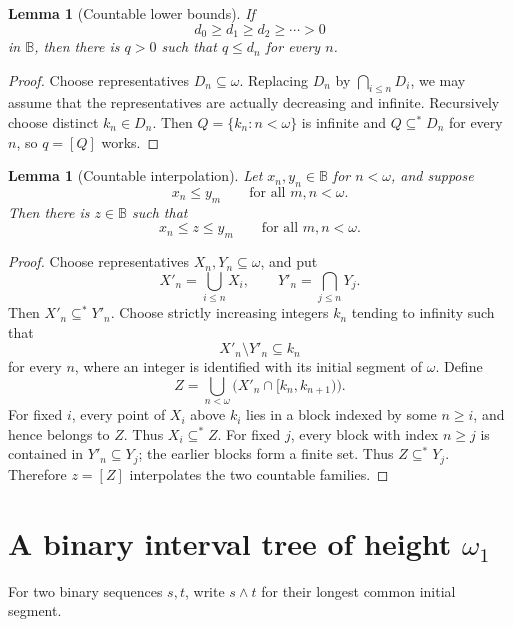 \documentclass[11pt]{article}
\newtheorem{lemma}[theorem]{Lemma}
\theoremstyle{definition}
\theoremstyle{remark}
\newcommand{\B}{\mathbb B}
\begin{document}
\begin{lemma}[Countable lower bounds]\label{lem:sigmaclosed}
If
\[
  d_0\geq d_1\geq d_2\geq\cdots>0
\]
in \(\B\), then there is \(q>0\) such that \(q\leq d_n\) for every \(n\).
\end{lemma}

\begin{proof}
Choose representatives \(D_n\subseteq\omega\).  Replacing \(D_n\) by
\(\bigcap_{i\leq n}D_i\), we may assume that the representatives are actually
decreasing and infinite.  Recursively choose distinct
\(k_n\in D_n\).  Then \(Q=\{k_n:n<\omega\}\) is infinite and
\(Q\subseteq^*D_n\) for every \(n\), so \(q=[Q]\) works.
\end{proof}

\begin{lemma}[Countable interpolation]\label{lem:interpolation}
Let \(x_n,y_n\in\B\) for \(n<\omega\), and suppose
\[
  x_n\leq y_m\qquad\text{for all }m,n<\omega.
\]
Then there is \(z\in\B\) such that
\[
  x_n\leq z\leq y_m\qquad\text{for all }m,n<\omega.
\]
\end{lemma}

\begin{proof}
Choose representatives \(X_n,Y_n\subseteq\omega\), and put
\[
  X'_n=\bigcup_{i\leq n}X_i,
  \qquad
  Y'_n=\bigcap_{j\leq n}Y_j.
\]
Then \(X'_n\subseteq^*Y'_n\).  Choose strictly increasing integers
\(k_n\) tending to infinity such that
\[
  X'_n\setminus Y'_n\subseteq k_n
\]
for every \(n\), where an integer is identified with its initial segment of
\(\omega\).  Define
\[
  Z=\bigcup_{n<\omega}
       \bigl(X'_n\cap[k_n,k_{n+1})\bigr).
\]
For fixed \(i\), every point of \(X_i\) above \(k_i\) lies in a block indexed
by some \(n\geq i\), and hence belongs to \(Z\).  Thus
\(X_i\subseteq^*Z\).  For fixed \(j\), every block with index \(n\geq j\) is
contained in \(Y'_n\subseteq Y_j\); the earlier blocks form a finite set.
Thus \(Z\subseteq^*Y_j\).  Therefore \(z=[Z]\) interpolates the two
countable families.
\end{proof}

\section{A binary interval tree of height
\texorpdfstring{\(\omega_1\)}{omega1}}

For two binary sequences \(s,t\), write \(s\wedge t\) for their longest common
initial segment.
\end{document}
